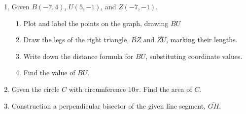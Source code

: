 \begin{enumerate}
\item Given $B(-7, 4)$, $U(5, -1)$, and $Z(-7, -1)$.
\begin{enumerate}
  \item Plot and label the points on the graph, drawing $\overline{BU}$
  \item Draw the legs of the right triangle, $\overline{BZ}$ and $\overline{ZU}$, marking their lengths.
  \item Write down the distance formula for $BU$, substituting coordinate values.
  \item Find the value of $BU$.
\end{enumerate}

\newpage
\item Given the circle $C$ with circumference $10\pi$. Find the area of $C$. \vspace{5cm}

\item Construction a perpendicular bisector of the given line segment, $\overline{GH}$.\\
  \vspace{4cm}
  \begin{center}
  \end{center}


\end{enumerate}
